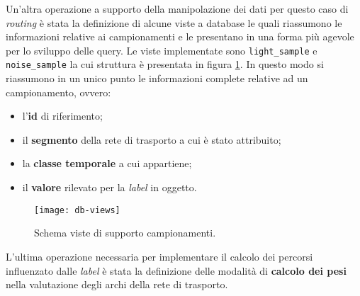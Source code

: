 Un'altra operazione a supporto della manipolazione dei dati per questo caso di \emph{routing} è stata la definizione di alcune viste a database le quali riassumono le informazioni relative ai campionamenti e le presentano in una forma più agevole per lo sviluppo delle query. Le viste implementate sono \texttt{light\_sample} e \texttt{noise\_sample} la cui struttura è presentata in figura \ref{fig:db-views}. In questo modo si riassumono in un unico punto le informazioni complete relative ad un campionamento, ovvero:
\begin{itemize}
\item l'\textbf{id} di riferimento;
\item il \textbf{segmento} della rete di trasporto a cui è stato attribuito;
\item la \textbf{classe temporale} a cui appartiene;
\item il \textbf{valore} rilevato per la \emph{label} in oggetto.
\end{itemize}

\begin{figure}[ht]
  \centering
  \texttt{[image: db-views]}
  \caption{\footnotesize{Schema viste di supporto campionamenti.}}
  \label{fig:db-views}
\end{figure}

L'ultima operazione necessaria per implementare il calcolo dei percorsi influenzato dalle \emph{label} è stata la definizione delle modalità di \textbf{calcolo dei pesi} nella valutazione degli archi della rete di trasporto.

